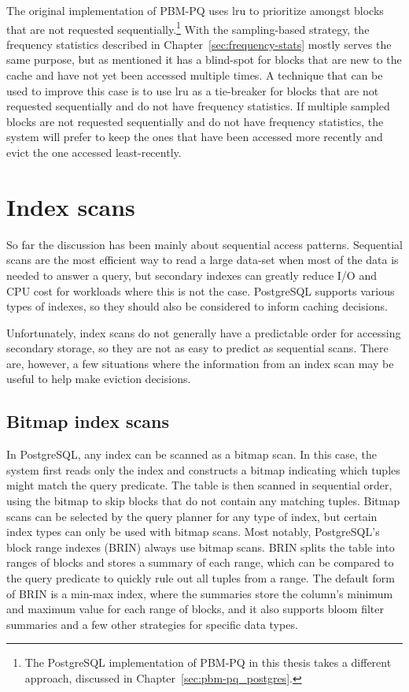 The original implementation of PBM-PQ \cite{pbm} uses \gls{lru} to prioritize amongst blocks that are not requested sequentially.\footnote{The PostgreSQL implementation of PBM-PQ in this thesis takes a different approach, discussed in Chapter~\ref{sec:pbm-pq_postgres}.} With the sampling-based strategy, the frequency statistics described in Chapter~\ref{sec:frequency-stats} mostly serves the same purpose, but as mentioned it has a blind-spot for blocks that are new to the cache and have not yet been accessed multiple times. A technique that can be used to improve this case is to use \gls{lru} as a tie-breaker for blocks that are not requested sequentially and do not have frequency statistics. If multiple sampled blocks are not requested sequentially and do not have frequency statistics, the system will prefer to keep the ones that have been accessed more recently and evict the one accessed least-recently. %


\section{\label{sec:index_scans}Index scans}

So far the discussion has been mainly about sequential access patterns. Sequential scans are the most efficient way to read a large data-set when most of the data is needed to answer a query, but secondary indexes can greatly reduce I/O and CPU cost for workloads where this is not the case. PostgreSQL supports various types of indexes, so they should also be considered to inform caching decisions.

Unfortunately, index scans do not generally have a predictable order for accessing secondary storage, so they are not as easy to predict as sequential scans. There are, however, a few situations where the information from an index scan may be useful to help make eviction decisions.

\subsection{\label{sec:bitmap_scans}Bitmap index scans}

In PostgreSQL, any index can be scanned as a bitmap scan. In this case, the system first reads only the index and constructs a bitmap indicating which tuples might match the query predicate. The table is then scanned in sequential order, using the bitmap to skip blocks that do not contain any matching tuples. Bitmap scans can be selected by the query planner for any type of index, but certain index types can only be used with bitmap scans. Most notably, PostgreSQL's block range indexes (BRIN) always use bitmap scans. BRIN splits the table into ranges of blocks and stores a summary of each range, which can be compared to the query predicate to quickly rule out all tuples from a range. The default form of BRIN is a min-max index, where the summaries store the column's minimum and maximum value for each range of blocks, and it also supports bloom filter summaries and a few other strategies for specific data types.


